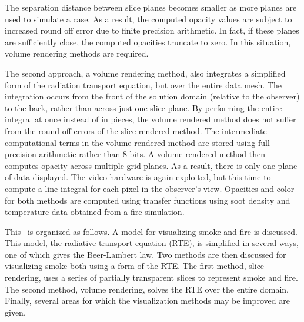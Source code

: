 The separation distance between slice planes becomes smaller as
more planes are used to simulate a case.  As a result, the
computed opacity values are subject to increased round off error
due to finite precision arithmetic.  In fact, if these planes are
sufficiently close, the computed opacities truncate to zero.   In
this situation, volume rendering methods are required.

The second approach, a volume rendering method, also integrates a
simplified form of the radiation transport equation, but over the
entire data mesh.  The integration occurs from the front of the
solution domain (relative to the observer) to the back, rather
than across just one slice plane. By performing the entire
integral at once instead of in pieces, the volume rendered method
does not suffer from the round off errors of the slice rendered
method.  The intermediate computational terms in the volume
rendered method are stored using full precision arithmetic rather
than 8 bits.  A volume rendered method then computes opacity
across multiple grid planes.  As a result, there is only one plane
of data displayed.  The video hardware is again exploited, but
this time to compute a line integral for each pixel in the
observer's view.  Opacities and color for both methods are
computed using transfer functions using soot density and
temperature data obtained from a fire simulation.

This \paper\ is organized as follows.  A model for visualizing
smoke and fire is discussed.  This model, the radiative transport
equation (RTE), is simplified in several ways, one of which gives
the Beer-Lambert law.  Two methods are then discussed for
visualizing smoke  both using a form of the RTE.  The first
method, slice rendering,  uses a series of partially transparent
slices to represent smoke and fire. The second method, volume
rendering, solves the RTE over the entire domain. Finally, several
areas for which the visualization methods may be improved are
given.


